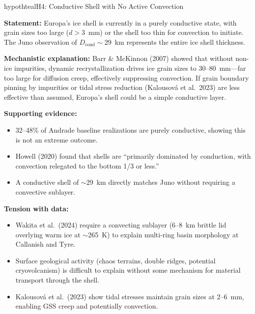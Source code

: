 \documentclass[11pt,letterpaper]{article}
\begin{document}
\newpage
\begin{hypothesisbox}{hypothteal}{H4: Conductive Shell with No Active Convection}

\textbf{Statement:} Europa's ice shell is currently in a purely conductive state, with grain sizes too large ($d > 3$~mm) or the shell too thin for convection to initiate. The Juno observation of $D_\mathrm{cond} \sim 29$~km represents the entire ice shell thickness.

\textbf{Mechanistic explanation:} Barr \& McKinnon (2007) showed that without non-ice impurities, dynamic recrystallization drives ice grain sizes to 30--80~mm---far too large for diffusion creep, effectively suppressing convection. If grain boundary pinning by impurities or tidal stress reduction (Kalousov\'{a} et al.\ 2023) are less effective than assumed, Europa's shell could be a simple conductive layer.

\textbf{Supporting evidence:}
\begin{itemize}[nosep]
  \item 32--48\% of Andrade baseline realizations are purely conductive, showing this is not an extreme outcome.
  \item Howell (2020) found that shells are ``primarily dominated by conduction, with convection relegated to the bottom 1/3 or less.''
  \item A conductive shell of $\sim$29~km directly matches Juno without requiring a convective sublayer.
\end{itemize}

\textbf{Tension with data:}
\begin{itemize}[nosep]
  \item Wakita et al.\ (2024) require a convecting sublayer (6--8~km brittle lid overlying warm ice at $\sim$265~K) to explain multi-ring basin morphology at Callanish and Tyre.
  \item Surface geological activity (chaos terrains, double ridges, potential cryovolcanism) is difficult to explain without some mechanism for material transport through the shell.
  \item Kalousov\'{a} et al.\ (2023) show tidal stresses maintain grain sizes at 2--6~mm, enabling GSS creep and potentially convection.
\end{itemize}
\end{hypothesisbox}
\end{document}
